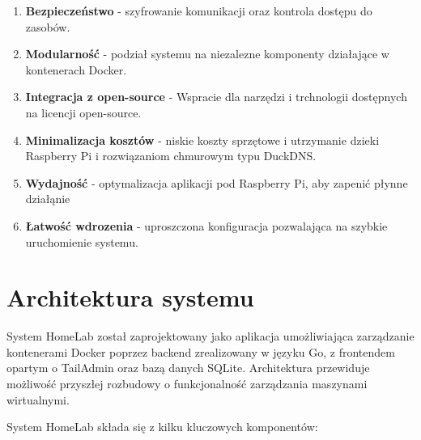 \begin{enumerate}
    \item \textbf{Bezpieczeństwo} - szyfrowanie komunikacji oraz kontrola dostępu do zasobów.
    \item \textbf{Modularność} - podział systemu na niezalezne komponenty działające w kontenerach Docker.
    \item \textbf{Integracja z open-source} - Wspracie dla narzędzi i trchnologii dostępnych na licencji open-source.
    \item \textbf{Minimalizacja kosztów} - niskie koszty sprzętowe i utrzymanie dzieki Raspberry Pi i rozwiązaniom chmurowym typu DuckDNS.
    \item \textbf{Wydajność} - optymalizacja aplikacji pod Raspberry Pi, aby zapenić płynne działąnie 
    \item \textbf{Łatwość wdrozenia} - uproszczona konfiguracja pozwalająca na szybkie uruchomienie systemu.
\end{enumerate}

\pagebreak

\section{Architektura systemu}
System HomeLab został zaprojektowany jako aplikacja umożliwiająca zarządzanie kontenerami Docker poprzez backend zrealizowany w języku Go, z frontendem opartym o TailAdmin oraz bazą danych SQLite. Architektura przewiduje możliwość przyszłej rozbudowy o funkcjonalność zarządzania maszynami wirtualnymi.

System HomeLab składa się z kilku kluczowych komponentów:

